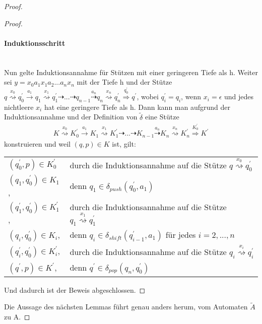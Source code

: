 \begin{proof}
\begin{proof}
\paragraph{Induktionsschritt}\ \\
Nun gelte Induktionsannahme für Stützen mit einer geringeren Tiefe als h. Weiter sei $y = x_0a_1x_1a_2...a_nx_n$ mit der Tiefe h und der Stütze $q \stackrel{x_0}{\rightsquigarrow} q_0^{\prime} \stackrel{a_1}{\rightarrow} q_1\stackrel{x_1}{\rightsquigarrow} q_1^{\prime} \dashrightarrow ... \dashrightarrow q_{n-1} \stackrel{a_n}{\dashrightarrow} q_n \stackrel{x_n}{\rightsquigarrow} q_n^{\prime} \stackrel {q_0^{\prime}} {\Rightarrow} q^\prime$, wobei $q_i^\prime = q_i$, wenn $x_i = \epsilon$ und jedes nichtleere $x_i$ hat eine geringere Tiefe als h. Dann kann man aufgrund der Induktionsannahme und der Definition von $\tilde{\delta}$ eine Stütze
\begin{eqnarray*}
K \stackrel{x_0}{\rightsquigarrow} K_0^{\prime} \stackrel{a_1}{\rightarrow} K_1\stackrel{x_1}{\rightsquigarrow} K_1^{\prime} \dashrightarrow ... \dashrightarrow K_{n-1} \stackrel{a_n}{\dashrightarrow} K_n \stackrel{x_n}{\rightsquigarrow} K_n^{\prime} \stackrel {K_0^{\prime}} {\Rightarrow} K^\prime 
\end{eqnarray*}
konstruieren und weil $(q,p) \in K$ ist, gilt:\\[1ex]
\begin{tabular}[c] {l l}
$(q_0^\prime, p) \in K_0^\prime $  & durch die Induktionsannahme auf die Stütze $q \stackrel{x_0}{\rightsquigarrow} q_0^\prime$ \\
$ (q_1, q_0^\prime) \in K_1$, & denn $q_1 \in \delta_{push}(q_0^\prime, a_1)$ \\
$(q_1^\prime, q_0^\prime) \in K_1^\prime$, & durch die Induktionsannahme auf die Stütze $q_1 \stackrel{x_1}{\rightsquigarrow} q_1^\prime$\\ 
$ (q_i, q_0^\prime) \in K_i$, & denn $q_i \in \delta_{shift}(q_{i-1}^\prime, a_1)$ für jedes $i=2,...,n$ \\
$(q_i^\prime, q_0^\prime) \in K_i^\prime$, & durch die Induktionsannahme auf die Stütze $q_i \stackrel{x_i}{\rightsquigarrow} q_i^\prime$\\ 
$ (q^\prime, p) \in K^\prime$, & denn $q^\prime \in \delta_{pop}(q_n, q_0^\prime)$ \\
\end{tabular}
Und dadurch ist der Beweis abgeschlossen.
\end{proof}
Die Aussage des nächsten Lemmas führt genau anders herum, vom Automaten $\tilde{A}$ zu A.

\end{proof}
